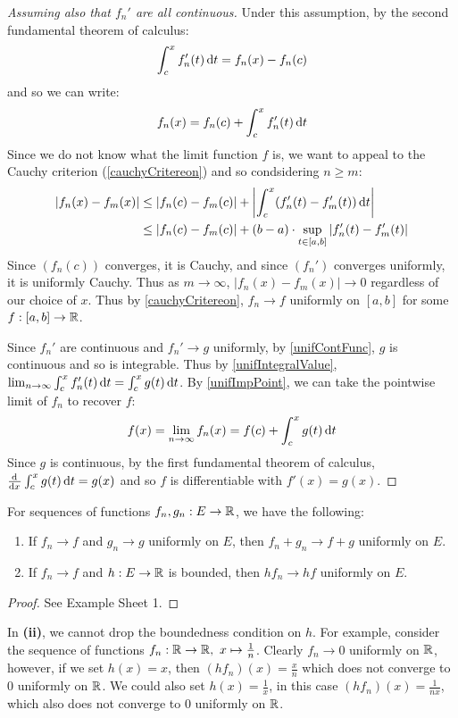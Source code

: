 \documentclass[../main.tex]{subfiles}
\begin{document}
\begin{proof}[Assuming also that $f_n'$ are all continuous]\par
  Under this assumption, by the second fundamental theorem of calculus:
  \[
    \int_{c}^{x} f_n'(t) \d{t} = f_n(x) - f_n(c)
  \]
  and so we can write:
  \[
    f_n(x) = f_n(c) + \int_{c}^{x} f_n'(t) \d{t}
  \]
  Since we do not know what the limit function $f$ is, we want to appeal to the Cauchy criterion (\cref{cauchyCritereon}) and so condsidering $n \geq m$:
  \begin{align*}
    |f_n(x) - f_m(x)| &\leq |f_n(c) - f_m(c)| + \abs{\int_{c}^{x} (f_n'(t) - f_m'(t)) \d{t}} \\
                      &\leq |f_n(c) - f_m(c)| + (b - a) \cdot \sup_{t \in [a, b]} |f_n'(t) - f_m'(t)|
  \end{align*}
  Since $(f_n(c))$ converges, it is Cauchy, and since $(f_n')$ converges uniformly, it is uniformly Cauchy.
  Thus as $m \to \infty$, $|f_n(x) - f_m(x)| \to 0$ regardless of our choice of $x$.
  Thus by \cref{cauchyCritereon}, $f_n \to f$ uniformly on $[a, b]$ for some $f: [a, b] \to \mathbb{R}$.

  Since $f_n'$ are continuous and $f_n' \to g$ uniformly, by \cref{unifContFunc}, $g$ is continuous and so is integrable.
  Thus by \cref{unifIntegralValue}, $\lim_{n \to \infty} \int_{c}^{x} f'_n(t) \d{t} = \int_{c}^{x} g(t) \d{t}$.
  By \cref{unifImpPoint}, we can take the pointwise limit of $f_n$ to recover $f$:
  \[
    f(x) = \lim_{n \to \infty} f_n(x) = f(c) + \int_{c}^{x} g(t) \d{t}
  \]
  Since $g$ is continuous, by the first fundamental theorem of calculus, $\deriv{}{x} \int_{c}^{x} g(t) \d{t} = g(x)$ and so $f$ is differentiable with $f'(x) = g(x)$.
\end{proof}
\begin{proposition}
  For sequences of functions $f_n, g_n: E \to \mathbb{R}$, we have the following:
  \begin{enumerate}
    \item If $f_n \to f$ and $g_n \to g$ uniformly on $E$, then $f_n + g_n \to f + g$ uniformly on $E$.
    \item If $f_n \to f$ and $h: E \to \mathbb{R}$ is bounded, then $hf_n \to hf$ uniformly on $E$.
  \end{enumerate}
\end{proposition}
\begin{proof}
  See Example Sheet 1.
\end{proof}
\begin{remark}
  In \textbf{(ii)}, we cannot drop the boundedness condition on $h$.
  For example, consider the sequence of functions $f_n: \mathbb{R} \to \mathbb{R},\ x \mapsto \frac{1}{n}$.
  Clearly $f_n \to 0$ uniformly on $\mathbb{R}$, however, if we set $h(x) = x$, then $(h f_n)(x) = \frac{x}{n}$ which does not converge to 0 uniformly on $\mathbb{R}$.
  We could also set $h(x) = \frac{1}{x}$, in this case $(hf_n)(x) = \frac{1}{nx}$, which also does not converge to 0 uniformly on $\mathbb{R}$.
\end{remark}
\end{document}
